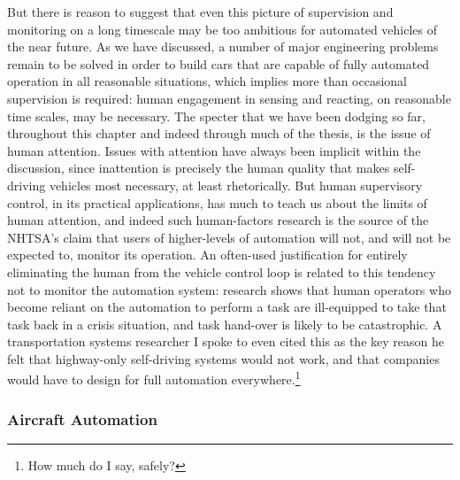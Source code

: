 But there is reason to suggest that even this picture of supervision
and monitoring on a long timescale may be too ambitious for automated
vehicles of the near future. As we have discussed, a number of major
engineering problems remain to be solved in order to build cars that
are capable of fully automated operation in all reasonable situations,
which implies more than occasional supervision is required: human engagement in
sensing and reacting, on reasonable time scales, may be necessary. The
specter that we have been dodging so far, throughout this chapter and
indeed through much of the thesis, is the issue of human attention.
Issues with attention have always been implicit within the discussion,
since inattention is precisely the human quality that makes
self-driving vehicles most necessary, at least rhetorically. But human
supervisory control, in its practical applications, has much to teach
us about the limits of human attention, and indeed such human-factors
research is the source of the NHTSA's claim that users of
higher-levels of automation will not, and will not be expected to,
monitor its operation. An often-used justification
for entirely eliminating the human from the vehicle control loop is
related to this tendency not to monitor the automation system:
research shows that human operators who become reliant on the
automation to perform a task are ill-equipped to take that task back
in a crisis situation, and task hand-over is likely to be
catastrophic.\cite{???} A transportation systems researcher I spoke to
even cited this as the key reason he felt that highway-only
self-driving systems would not work, and that companies would have to
design for full automation everywhere.\footnote{How much do I say,
  safely?} 

\subsubsection{Aircraft Automation}

